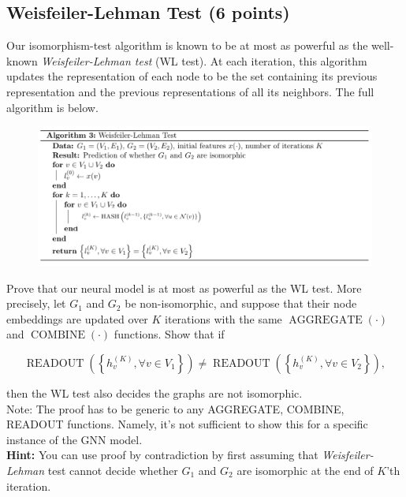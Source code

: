 \documentclass{article}
\numberwithin{figure}{section}
\begin{document}
\subsection{Weisfeiler-Lehman Test (6 points)}
Our isomorphism-test algorithm is known to be at most as powerful as the well-known \textit{Weisfeiler-Lehman test} (WL test). At each iteration, this algorithm updates the representation of each node to be the set containing its previous representation and the previous representations of all its neighbors. The full algorithm is below.

    \begin{figure}[H]
        \centering
        \includegraphics[width=1.0\textwidth]{CS224W_Homework1/algo-3.png}
        \label{fig:my_label}
    \end{figure}

    Prove that our neural model is at most as powerful as the WL test. More precisely, let $G_1$ and $G_2$ be non-isomorphic, and suppose that their node embeddings are updated over $K$ iterations with the same $\operatorname{AGGREGATE}(\cdot)$ and $\operatorname{COMBINE}(\cdot)$ functions. Show that if

    $$\operatorname { READOUT }\left(\left\{h_v^{(K)}, \forall v \in V_1\right\}\right) \neq \operatorname { READOUT }\left(\left\{h_v^{(K)}, \forall v \in V_2\right\}\right),$$

then the WL test also decides the graphs are not isomorphic.\\

Note: The proof has to be generic to any AGGREGATE, COMBINE, READOUT functions. Namely, it's not sufficient to show this for a specific instance of the GNN model.\\

\textbf{Hint:} You can use proof by contradiction by first assuming that \textit{Weisfeiler-Lehman} test cannot decide whether $G_1$ and $G_2$ are isomorphic at the end of $K$’th iteration.
\end{document}
